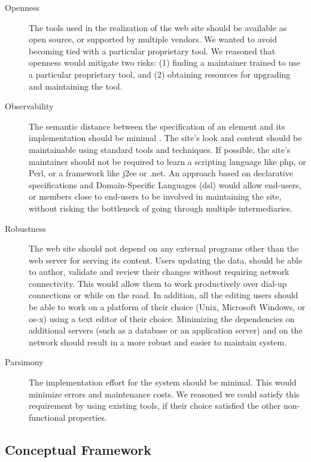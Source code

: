 \documentclass{article}
\begin{document}
\begin{description}
\item[Openness] The tools used in the realization of the web site
should be available as open source, or supported by multiple vendors.
We wanted to avoid becoming tied with a particular proprietary
tool.
We reasoned that openness would mitigate two risks:
(1) finding a maintainer trained to use a particular proprietary tool,
and (2) obtaining resources for upgrading and maintaining the tool.

\item[Observability]
The semantic distance between
the specification of an element and its implementation 
should be minimal \cite{SG97}.
The site's look and content should be maintainable
using standard tools and techniques.
If possible, the site's maintainer should not be required to
learn a scripting language like {\sc php}, or Perl, or
a framework like {\sc j2ee} or {\sc .net}.
An approach based on declarative specifications \cite{FFLS00} and
Domain-Specific Languages ({\sc dsl}) \cite{DKV00,Spi00b} would allow end-users, or members
close to end-users to be involved in maintaining the site,
without risking the bottleneck of going through
multiple intermediaries.

\item[Robustness] The web site should not depend on
any external programs other than the web server for serving
its content.
Users updating the data, should be able to author, validate and 
review their changes without requiring network connectivity.
This would allow them to work productively over dial-up connections
or while on the road. In addition, all the editing users should be able 
to work on a platform of their choice (Unix, Microsoft Windows, or {\sc os-x}) 
using a text editor of their choice.
Minimizing the dependencies on additional servers (such as a
database or an application server) and on the network
should result in a more robust and easier to maintain system.

\item[Parsimony] The implementation effort for
the system should be minimal.
This would minimize errors and maintenance costs.
We reasoned we could satisfy this requirement by
using existing tools, if their choice satisfied the
other non-functional properties.
\end{description} 

\subsection{Conceptual Framework}
\end{document}
